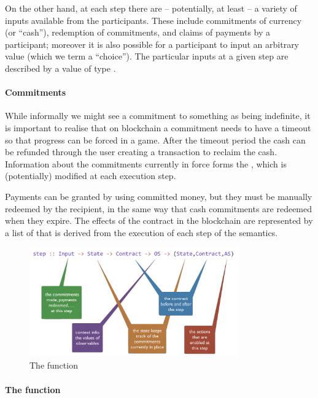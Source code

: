 \documentclass[runningheads]{llncs}
\begin{document}
On the other hand, at each step there are -- potentially, at least -- a variety of inputs available from the 
participants. These include commitments of currency (or ``cash''), redemption of commitments, and claims of payments by 
a participant; moreover it is also possible for a participant to input an arbitrary value (which we term a ``choice''). 
The particular inputs at a given step are described by a value of type .

\paragraph{Commitments}


While informally we might see a commitment to something as being indefinite, it is important to realise that on 
blockchain a commitment needs to have a timeout so that progress can be forced in a game. After the timeout period the 
cash can be refunded through the user creating a transaction to reclaim the cash.
Information about the commitments currently in force forms the , which is (potentially) modified 
at each execution step. 

Payments can be granted by using committed money, but they must be manually redeemed by the recipient, in the 
same way that cash commitments are redeemed when they expire. The effects of the contract in the blockchain are 
represented by a list  of  that is derived from the execution of each step of 
the semantics.

\begin{figure}[t]
\begin{center}
\includegraphics[width=0.8\textwidth]{pix/step-type.png}
\caption{The  function}
\label{fig:step-function}
\end{center}
\end{figure}

\paragraph{The  function}
\end{document}
